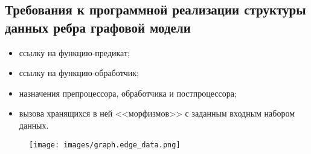 \subsection{Требования к программной реализации структуры данных ребра графовой модели}
\begin{frame}%
	\begin{itemize}
		\begin{itemize}
			\item ссылку на функцию-предикат;
			\item ссылку на функцию-обработчик;
		\end{itemize}
		\begin{itemize}
			\item назначения препроцессора, обработчика и постпроцессора;
			\item вызова хранящихся в ней <<морфизмов>> с заданным входным набором данных.
		\end{itemize}
	\end{itemize}
	\begin{figure}
		\texttt{[image: images/graph.edge\_data.png]}
	\end{figure}
\end{frame}

